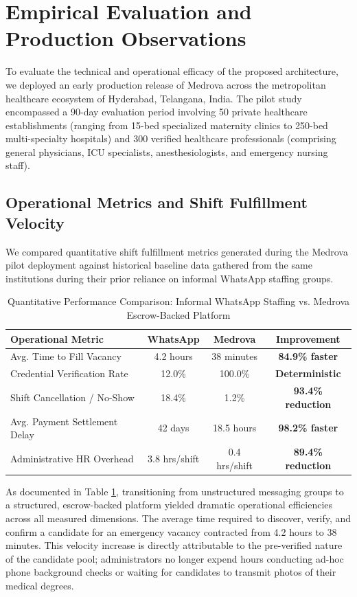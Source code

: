 \documentclass[conference]{IEEEtran}
\begin{document}
\section{Empirical Evaluation and Production Observations}
To evaluate the technical and operational efficacy of the proposed architecture, we deployed an early production release of Medrova across the metropolitan healthcare ecosystem of Hyderabad, Telangana, India. The pilot study encompassed a 90-day evaluation period involving 50 private healthcare establishments (ranging from 15-bed specialized maternity clinics to 250-bed multi-specialty hospitals) and 300 verified healthcare professionals (comprising general physicians, ICU specialists, anesthesiologists, and emergency nursing staff).

\subsection{Operational Metrics and Shift Fulfillment Velocity}
We compared quantitative shift fulfillment metrics generated during the Medrova pilot deployment against historical baseline data gathered from the same institutions during their prior reliance on informal WhatsApp staffing groups.

\begin{table}[htbp]
\caption{Quantitative Performance Comparison: Informal WhatsApp Staffing vs. Medrova Escrow-Backed Platform}
\begin{center}
\begin{tabular}{l c c c}
\toprule
\textbf{Operational Metric} & \textbf{WhatsApp} & \textbf{Medrova} & \textbf{Improvement} \\
\midrule
Avg. Time to Fill Vacancy & 4.2 hours & 38 minutes & \textbf{84.9\% faster} \\
Credential Verification Rate & 12.0\% & 100.0\% & \textbf{Deterministic} \\
Shift Cancellation / No-Show & 18.4\% & 1.2\% & \textbf{93.4\% reduction} \\
Avg. Payment Settlement Delay & 42 days & 18.5 hours & \textbf{98.2\% faster} \\
Administrative HR Overhead & 3.8 hrs/shift & 0.4 hrs/shift & \textbf{89.4\% reduction} \\
\bottomrule
\end{tabular}
\label{tab:performance_metrics}
\end{center}
\end{table}

As documented in Table \ref{tab:performance_metrics}, transitioning from unstructured messaging groups to a structured, escrow-backed platform yielded dramatic operational efficiencies across all measured dimensions. The average time required to discover, verify, and confirm a candidate for an emergency vacancy contracted from 4.2 hours to 38 minutes. This velocity increase is directly attributable to the pre-verified nature of the candidate pool; administrators no longer expend hours conducting ad-hoc phone background checks or waiting for candidates to transmit photos of their medical degrees.
\end{document}
